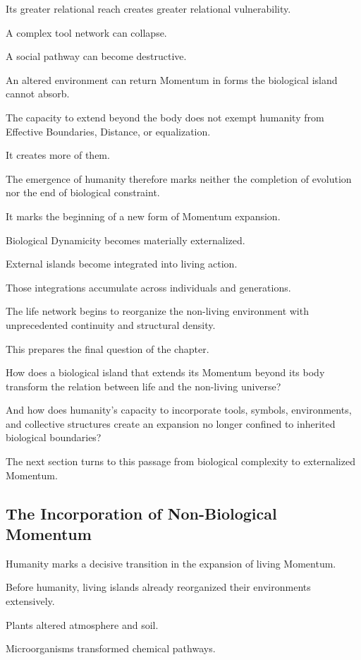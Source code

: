 Its greater relational reach creates greater relational vulnerability.

A complex tool network can collapse.

A social pathway can become destructive.

An altered environment can return Momentum in forms the biological island cannot absorb.

The capacity to extend beyond the body does not exempt humanity from Effective Boundaries, Distance, or equalization.

It creates more of them.

The emergence of humanity therefore marks neither the completion of evolution nor the end of biological constraint.

It marks the beginning of a new form of Momentum expansion.

Biological Dynamicity becomes materially externalized.

External islands become integrated into living action.

Those integrations accumulate across individuals and generations.

The life network begins to reorganize the non-living environment with unprecedented continuity and structural density.

This prepares the final question of the chapter.

How does a biological island that extends its Momentum beyond its body transform the relation between life and the non-living universe?

And how does humanity’s capacity to incorporate tools, symbols, environments, and collective structures create an expansion no longer confined to inherited biological boundaries?

The next section turns to this passage from biological complexity to externalized Momentum.

\subsection*{\textbf{The Incorporation of Non-Biological Momentum}} 

Humanity marks a decisive transition in the expansion of living Momentum.

Before humanity, living islands already reorganized their environments extensively.

Plants altered atmosphere and soil.

Microorganisms transformed chemical pathways.

